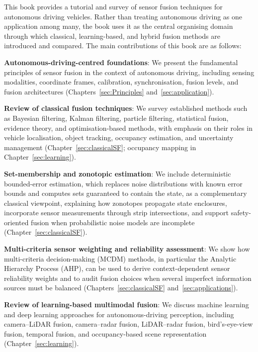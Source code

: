 This book provides a tutorial and survey of sensor fusion techniques for autonomous driving vehicles. Rather than treating autonomous driving as one application among many, the book uses it as the central organising domain through which classical, learning-based, and hybrid fusion methods are introduced and compared. The main contributions of this book are as follows:
\begin{list4a}
    \item \textbf{Autonomous-driving-centred foundations}: We present the fundamental principles of sensor fusion in the context of autonomous driving, including sensing modalities, coordinate frames, calibration, synchronisation, fusion levels, and fusion architectures (Chapters~\ref{sec:Principles} and~\ref{sec:application}).
    \item \textbf{Review of classical fusion techniques}: We survey established methods such as Bayesian filtering, Kalman filtering, particle filtering, statistical fusion, evidence theory, and optimisation-based methods, with emphasis on their roles in vehicle localisation, object tracking, occupancy estimation, and uncertainty management (Chapter~\ref{sec:classicalSF}; occupancy mapping in Chapter~\ref{sec:learning}).
    \item \textbf{Set-membership and zonotopic estimation}: We include deterministic bounded-error estimation, which replaces noise distributions with known error bounds and computes sets guaranteed to contain the state, as a complementary classical viewpoint, explaining how zonotopes propagate state enclosures, incorporate sensor measurements through strip intersections, and support safety-oriented fusion when probabilistic noise models are incomplete (Chapter~\ref{sec:classicalSF}).
    \item \textbf{Multi-criteria sensor weighting and reliability assessment}: We show how multi-criteria decision-making (MCDM) methods, in particular the Analytic Hierarchy Process (AHP), can be used to derive context-dependent sensor reliability weights and to audit fusion choices when several imperfect information sources must be balanced (Chapters~\ref{sec:classicalSF} and~\ref{sec:applications}).
    \item \textbf{Review of learning-based multimodal fusion}: We discuss machine learning and deep learning approaches for autonomous-driving perception, including camera--LiDAR fusion, camera--radar fusion, LiDAR--radar fusion, bird's-eye-view fusion, temporal fusion, and occupancy-based scene representation (Chapter~\ref{sec:learning}).

\end{list4a}
